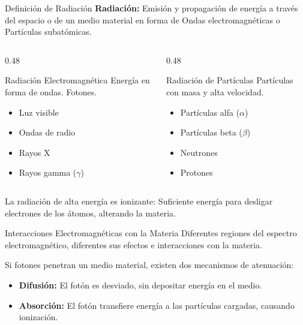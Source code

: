 \begin{frame}{Definición de Radiación}
  \textbf{Radiación:} Emisión y propagación de energía a través del
  espacio o de un medio material en forma de \alert{Ondas electromagnéticas} o
  \alert{Partículas subatómicas}.
  \vfill
  \begin{columns}[T]
    \begin{column}{0.48\textwidth}
      \begin{block}{Radiación Electromagnética}
        Energía en forma de ondas. Fotones.
        \begin{itemize}
          \item Luz visible
          \item Ondas de radio
          \item Rayos X
          \item Rayos gamma ($\gamma$)
        \end{itemize}
      \end{block}
    \end{column}

    \begin{column}{0.48\textwidth}
      \begin{block}{Radiación de Partículas}
        Partículas con masa y alta velocidad.
        \begin{itemize}
          \item Partículas alfa ($\alpha$)
          \item Partículas beta ($\beta$)
          \item Neutrones
          \item Protones
        \end{itemize}
      \end{block}
    \end{column}
  \end{columns}
  \vfill

  La radiación de alta energía es \alert{ionizante}: Suficiente energía
  para desligar electrones de los átomos, alterando la materia.
\end{frame}

\begin{frame}{Interacciones Electromagnéticas con la Materia}
  Diferentes regiones del espectro electromagnético, diferentes sus efectos e
  interacciones con la materia.

  Si \alert{fotones} penetran un medio material, existen dos mecanismos de
  atenuación:
  \begin{itemize}
    \item \textbf{Difusión:} El fotón es desviado, sin
      depositar energía en el medio.
    \item \textbf{Absorción:} El fotón transfiere energía a las partículas
      cargadas, causando ionización.
  \end{itemize}
\end{frame}

